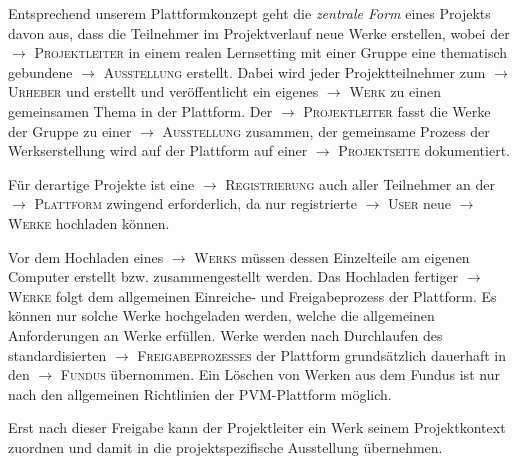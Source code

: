 \documentclass[a4paper,11pt]{article}
\newcommand{\glossar}[1]{{$\to$ \textsc{#1}}}
\begin{document}
Entsprechend unserem Plattformkonzept geht die \emph{zentrale Form} eines
Projekts davon aus, dass die Teilnehmer im Projektverlauf neue Werke
erstellen, wobei der \glossar{Projektleiter} in einem realen Lernsetting mit
einer Gruppe eine thematisch gebundene \glossar{Ausstellung} erstellt. Dabei
wird jeder Projektteilnehmer zum \glossar{Urheber} und erstellt und
veröffentlicht ein eigenes \glossar{Werk} zu einen gemeinsamen Thema in der
Plattform. Der \glossar{Projektleiter} fasst die Werke der Gruppe zu einer
\glossar{Ausstellung} zusammen, der gemeinsame Prozess der Werkserstellung
wird auf der Plattform auf einer \glossar{Projektseite} dokumentiert. 

Für derartige Projekte ist eine \glossar{Registrierung} auch aller Teilnehmer
an der \glossar{Plattform} zwingend erforderlich, da nur registrierte
\glossar{User} neue \glossar{Werke} hochladen können.

Vor dem Hochladen eines \glossar{Werks} müssen dessen Einzelteile am eigenen
Computer erstellt bzw. zusammengestellt werden.  Das Hochladen fertiger
\glossar{Werke} folgt dem allgemeinen Einreiche- und Freigabeprozess der
Plattform.  Es können nur solche Werke hochgeladen werden, welche die
allgemeinen Anforderungen an Werke erfüllen. Werke werden nach Durchlaufen des
standardisierten \glossar{Freigabeprozesses} der Plattform grundsätzlich
dauerhaft in den \glossar{Fundus} übernommen.  Ein Löschen von Werken aus dem
Fundus ist nur nach den allgemeinen Richtlinien der PVM-Plattform möglich.

Erst nach dieser Freigabe kann der Projektleiter ein Werk seinem
Projektkontext zuordnen und damit in die projektspezifische Ausstellung
übernehmen.
\end{document}
